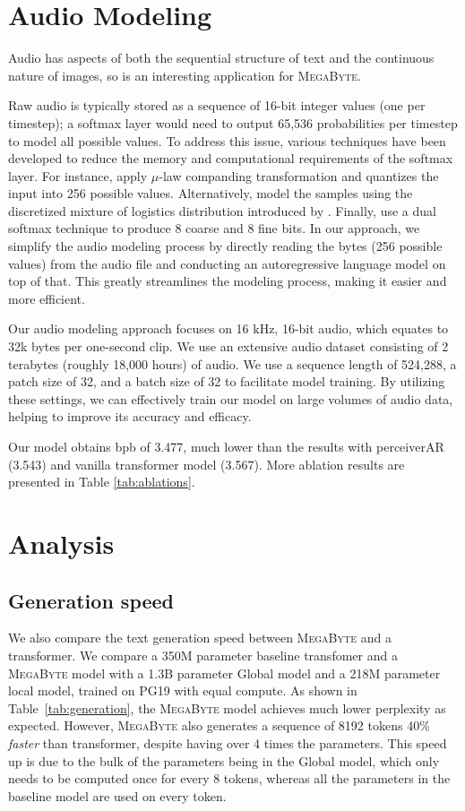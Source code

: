 \documentclass{article}
\newcommand{\fastslow}[0]{\textsc{MegaByte}\xspace}
\newcommand{\megabyte}[0]{\fastslow}
\theoremstyle{plain}
\theoremstyle{definition}
\theoremstyle{remark}
\begin{document}
\section{Audio Modeling}
\label{sec:speech}

Audio has aspects of both the sequential structure of text and the continuous nature of images, so is an interesting application for \megabyte.

Raw audio is typically stored as a sequence of 16-bit integer values (one per timestep); a softmax layer would need to output 65,536 probabilities per timestep to model all possible values. To address this issue, various techniques have been developed to reduce the memory and computational requirements of the softmax layer. For instance, \citet{wavenet} apply $\mu$-law companding transformation and quantizes the input into 256 possible values. Alternatively, \citet{parawavenet} model the samples using the discretized mixture of logistics distribution introduced by \citet{pixcelcnn++}. Finally, \citet{wavernn} use a dual softmax technique to produce 8 coarse and 8 fine bits. In our approach, we simplify the audio modeling process by directly reading the bytes (256 possible values) from the audio file and conducting an autoregressive language model on top of that. This greatly streamlines the modeling process, making it easier and more efficient.

Our audio modeling approach focuses on 16 kHz, 16-bit audio, which equates to 32k bytes per one-second clip. We use an extensive audio dataset consisting of 2 terabytes (roughly 18,000 hours) of audio. We use a sequence length of 524,288, a patch size of 32, and a batch size of 32 to facilitate model training. By utilizing these settings, we can effectively train our model on large volumes of audio data, helping to improve its accuracy and efficacy.

Our model obtains bpb of 3.477, much lower than the results with perceiverAR (3.543) and vanilla transformer model (3.567). More ablation results are presented in Table \ref{tab:ablations}. 

\section{Analysis}
\subsection{Generation speed}

We also compare the text generation speed between \megabyte and a transformer. 
We compare a 350M parameter baseline transfomer and a \megabyte model with a 1.3B parameter Global model and a 218M parameter local model, trained on PG19 with equal compute.
As shown in Table~\ref{tab:generation}, the \megabyte model achieves much lower perplexity as expected.
However, \megabyte also generates a sequence of 8192 tokens 40\% \emph{faster} than transformer, despite having over 4 times the parameters.
This speed up is due to the bulk of the parameters being in the Global model, which only needs to be computed once for every 8 tokens, whereas all the parameters in the baseline model are used on every token.
\end{document}
